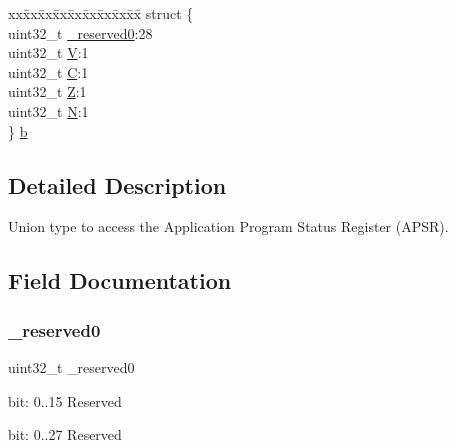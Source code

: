\begin{DoxyCompactItemize}
\begin{tabbing}
\end{tabbing}\item 
\begin{tabbing}
xx\=xx\=xx\=xx\=xx\=xx\=xx\=xx\=xx\=\kill
struct \{\\
\>uint32\_t \mbox{\hyperlink{union_a_p_s_r___type_ac8a6a13838a897c8d0b8bc991bbaf7c1}{\_reserved0}}:28\\
\>uint32\_t \mbox{\hyperlink{union_a_p_s_r___type_acd4a2b64faee91e4a9eef300667fa222}{V}}:1\\
\>uint32\_t \mbox{\hyperlink{union_a_p_s_r___type_a7a1caf92f32fe9ebd8d1fe89b06c7776}{C}}:1\\
\>uint32\_t \mbox{\hyperlink{union_a_p_s_r___type_a5ae954cbd9986cd64625d7fa00943c8e}{Z}}:1\\
\>uint32\_t \mbox{\hyperlink{union_a_p_s_r___type_abae0610bc2a97bbf7f689e953e0b451f}{N}}:1\\
\} \mbox{\hyperlink{union_a_p_s_r___type_acd7ff63a8cd9c5e58636027fd0d4abce}{b}}\\

\end{tabbing}\end{DoxyCompactItemize}


\subsection{Detailed Description}
Union type to access the Application Program Status Register (A\+P\+SR). 

\subsection{Field Documentation}
\mbox{\label{union_a_p_s_r___type_ac8a6a13838a897c8d0b8bc991bbaf7c1}} 
\subsubsection{\texorpdfstring{\_reserved0}{\_reserved0}}
{\footnotesize\ttfamily uint32\+\_\+t \+\_\+reserved0}

bit\+: 0..15 Reserved

bit\+: 0..27 Reserved \mbox{\label{union_a_p_s_r___type_a959a73d8faee56599b7e792a7c5a2d16}} 
